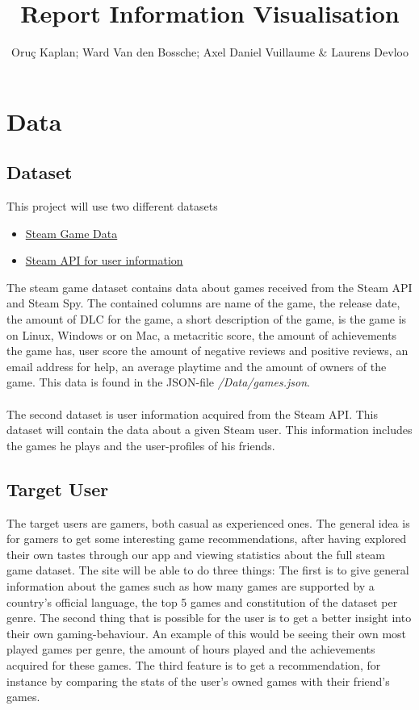 \documentclass{article}
\begin{document}
	\title{Report Information Visualisation}
	\author{Oruç Kaplan; Ward Van den Bossche; Axel Daniel Vuillaume \& Laurens Devloo}
	\maketitle
	\tableofcontents
	\newpage
	
	\section{Data}
	
	\subsection{Dataset}
	
	This project will use two different datasets
	
	\begin{itemize}
		\item \href{https://www.kaggle.com/datasets/fronkongames/steam-games-dataset/code}{Steam Game Data}
		\item\href{https://developer.valvesoftware.com/wiki/Steam_Web_API}{Steam API for user information}
	\end{itemize}
	
	The steam game dataset contains data about games received from the Steam API and Steam Spy. The contained columns are name of the game, the release date, the amount of DLC for the game, a short description of the game, is the game is on Linux, Windows or on Mac, a metacritic score, the amount of achievements the game has, user score the amount of negative reviews and positive reviews, an email address for help, an average playtime and the amount of owners of the game. This data is found in the JSON-file \textit{/Data/games.json}.\\
	\\
	The second dataset is user information acquired from the Steam API. This dataset will contain the data about a given Steam user. This information includes the games he plays and the user-profiles of his friends.
	
	\subsection{Target User}
	
	The target users are gamers, both casual as experienced ones. The general idea is for gamers to get some interesting game recommendations, after having explored their own tastes through our app and viewing statistics about the full steam game dataset. The site will be able to do three things: The first is to give general information about the games such as how many games are supported by a country's official language, the top 5 games and constitution of the dataset per genre. The second thing that is possible for the user is to get a better insight into their own gaming-behaviour. An example of this would be seeing their own most played games per genre, the amount of hours played and the achievements acquired for these games. The third feature is to get a recommendation, for instance by comparing the stats of the user's owned games with their friend's games.
	
\end{document}
